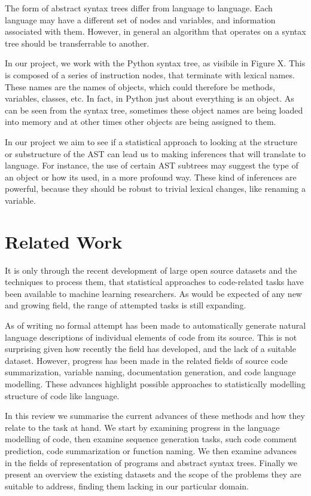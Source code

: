 The form of abstract syntax trees differ from language to language. 
Each language may have a different set of nodes and variables, and information associated with them.
However, in general an algorithm that operates on a syntax tree should be transferrable to another. 

In our project, we work with the Python syntax tree, as visibile in Figure X.
This is composed of a series of instruction nodes, that terminate with lexical names. 
These names are the names of objects, which could therefore be methods, variables, classes, etc. 
In fact, in Python just about everything is an object. 
As can be seen from the syntax tree, sometimes these object names are being loaded into memory and at other times other objects are being assigned to them.

In our project we aim to see if a statistical approach to looking at the structure or substructure of the AST can lead us to making inferences that will translate to language. 
For instance, the use of certain AST subtrees may suggest the type of an object or how its used, in a more profound way.
These kind of inferences are powerful, because they should be robust to trivial lexical changes, like renaming a variable.


\section{Related Work}

It is only through the recent development of large open source datasets and the techniques to process them, that statistical approaches to code-related tasks have been available to machine learning researchers. 
As would be expected of any new and growing field, the range of attempted tasks is still expanding. 


As of writing no formal attempt has been made to automatically generate natural language descriptions of individual elements of code from its source.  
This is not surprising given how recently the field has developed, and the lack of a suitable dataset.
However, progress has been made in the related fields of source code summarization, variable naming, documentation generation, and code language modelling. 
These advances highlight possible approaches to statistically modelling structure of code like language.  

In this review we summarise the current advances of these methods and how they relate to the task at hand.  We start by examining progress in the language modelling of code, then examine sequence generation tasks, such code comment prediction, code summarization or function naming. We then examine advances in the fields of representation of programs and abstract syntax trees. Finally we present an overview the existing datasets and the scope of the problems they are suitable to address, finding them lacking in our particular domain.


